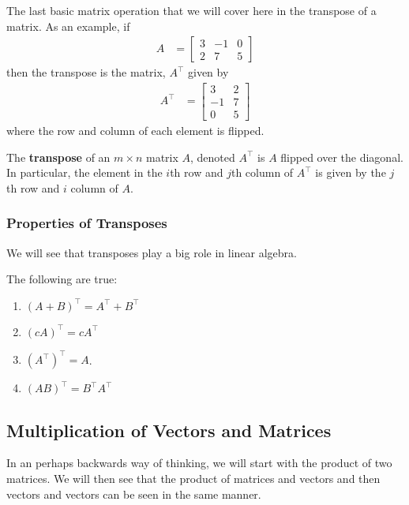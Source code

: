 The last basic matrix operation that we will cover here in the transpose of a matrix.  As an example, if
%
\begin{align*}
	A & = 
\begin{bmatrix}
	3 & -1 & 0 \\ 2 & 7 & 5
\end{bmatrix}
\end{align*}
then the transpose is the matrix, $A^{\intercal}$ given by
% 
\begin{align*}
	A^{\intercal} & = 
\begin{bmatrix}
	3 & 2 \\ -1 & 7 \\ 0 & 5
\end{bmatrix}
\end{align*}
where the row and column of each element is flipped.  

\begin{definition}
The \textbf{transpose} of an $m \times n$ matrix $A$,  denoted $A^{\intercal}$ is $A$ flipped over the diagonal.  In particular, the element in the $i$th row and $j$th column of $A^{\intercal}$ is given by the $j$th row and $i$ column of $A$.  
\end{definition}

\subsubsection{Properties of Transposes}

We will see that transposes play a big role in linear algebra.  

\begin{lemma}
The following are true:
\begin{enumerate}
\item $(A+B)^{\intercal} = A^{\intercal} + B^{\intercal}$
\item $(cA)^{\intercal} = c A^{\intercal}$
\item $(A^{\intercal})^{\intercal} = A$.
\item $(AB)^{\intercal} = B^{\intercal} A^{\intercal}$ 
\end{enumerate}
\end{lemma}

%
\subsection{Multiplication of Vectors and Matrices}
\label{sect:mult:matrix}

In an perhaps backwards way of thinking, we will start with the product of two matrices.  We will then see that the product of matrices and vectors and then vectors and vectors can be seen in the same manner.  

